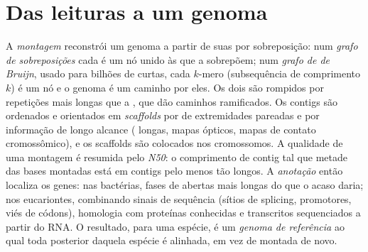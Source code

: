 \section{Das leituras a um genoma}

\begin{definition}\label{def:b3:genomics:assembly}
A \emph{montagem} reconstrói um genoma a partir de suas  por
sobreposição: num \emph{grafo de sobreposições} cada  é um nó
unido às  que a sobrepõem; num \emph{grafo de de Bruijn},
usado para bilhões de  curtas, cada $k$-mero (subsequência de
comprimento $k$) é um nó e o genoma é um caminho por eles. Os dois são
rompidos por repetições mais longas que a , que dão caminhos
ramificados. Os contigs são ordenados e orientados em \emph{scaffolds}
por  de extremidades pareadas e por informação de longo
alcance ( longas, mapas ópticos, mapas de contato
cromossômico), e os scaffolds são colocados nos cromossomos. A
qualidade de uma montagem é resumida pelo \emph{N50}: o comprimento de
contig tal que metade das bases montadas está em contigs pelo menos
tão longos. A \emph{anotação} então localiza os genes: nas bactérias,
fases de  abertas mais longas do que o acaso daria; nos
eucariontes, combinando sinais de sequência (sítios de splicing,
promotores, viés de códons), homologia com proteínas conhecidas e
transcritos sequenciados a partir do RNA. O resultado, para uma
espécie, é um \emph{genoma de referência} ao qual toda 
posterior daquela espécie é alinhada, em vez de montada de novo.
\end{definition}

